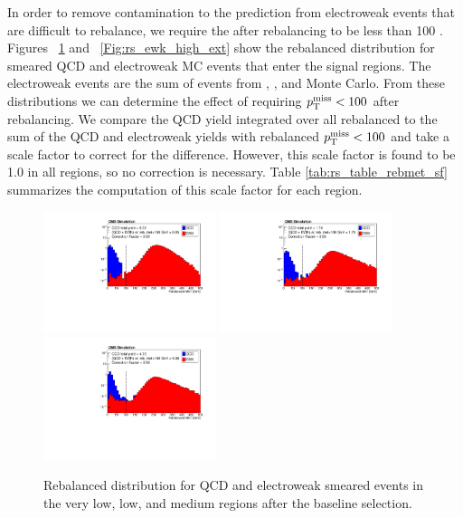 In order to remove contamination to the \rs prediction from electroweak events that are difficult to rebalance, we require the \ptmiss after rebalancing to be less than 100 \GeV.
Figures ~\ref{Fig:rs_ewk_low_med} and ~\ref{Fig:rs_ewk_high_ext} show the rebalanced \ptmiss distribution for smeared QCD and electroweak MC events that enter the signal regions.
The electroweak events are the sum of events from \znunu, \wjets, and \ttbar Monte Carlo. From these distributions we can determine the effect of requiring $p_{\mathrm{T}}^{\mathrm{miss}} < 100$ \GeV
after rebalancing. We compare the QCD yield integrated over all rebalanced \ptmiss to the sum of the QCD and electroweak yields with rebalanced $p_{\mathrm{T}}^{\mathrm{miss}} < 100$ \GeV and take a scale factor to
correct for the difference. However, this scale factor is found to be 1.0 in all \Ht regions, so no correction is necessary.
Table \ref{tab:rs_table_rebmet_sf} summarizes the computation of this scale factor for each \Ht region.

\begin{figure}[htbp]
  \begin{center}
    \includegraphics[width=0.45\textwidth]{figs/qcd/rs_mc/ewk/ewk_VL.pdf}
    \includegraphics[width=0.45\textwidth]{figs/qcd/rs_mc/ewk/ewk_L.pdf}
    \includegraphics[width=0.45\textwidth]{figs/qcd/rs_mc/ewk/ewk_M.pdf}
    \caption{Rebalanced \ptmiss distribution for QCD and electroweak smeared events in the very low, low, and medium \Ht regions after the baseline selection.
            }
    \label{Fig:rs_ewk_low_med}
  \end{center}
\end{figure}

